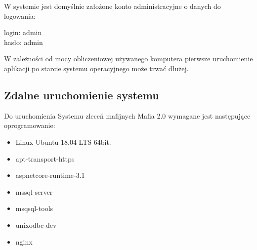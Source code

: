 \documentclass[12pt,a4paper]{article}
\begin{document}
			W systemie jest domyślnie założone konto administracyjne o danych do logowania:
			\begin{tcolorbox}[minipage,colback=white,arc=0pt,outer arc=0pt, fontupper=\footnotesize]
						login: admin\\
						hasło: admin
			\end{tcolorbox}
			\noindent W zależności od mocy obliczeniowej używanego komputera pierwsze uruchomienie aplikacji po starcie systemu operacyjnego może trwać dłużej.		
		
		\subsection{Zdalne uruchomienie systemu}
			\indent Do uruchomienia Systemu zleceń mafijnych Mafia 2.0 wymagane jest następujące oprogramowanie:
			\begin{itemize}
				\item Linux Ubuntu 18.04 LTS 64bit.
				\item apt-transport-https
				\item aspnetcore-runtime-3.1
				\item mssql-server
				\item msqsql-tools
				\item unixodbc-dev
				\item nginx
			\end{itemize}
			
\end{document}
